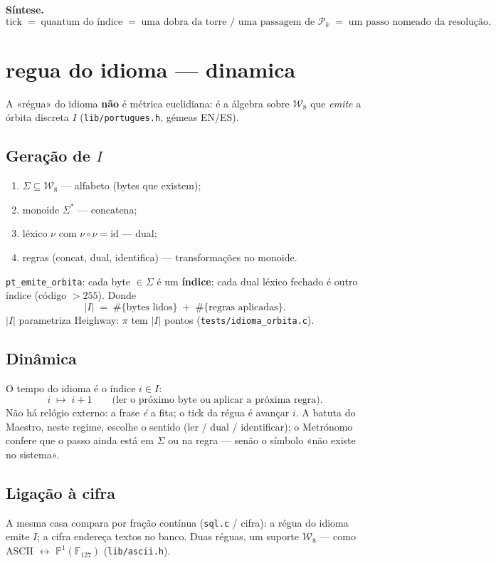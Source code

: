 \documentclass[11pt,a4paper]{article}
\newcommand{\code}[1]{\texttt{\small #1}}
\newcommand{\Word}{\mathcal{W}}
\begin{document}
\medskip\noindent\textbf{Síntese.}
\[
\boxed{
\mathrm{tick}
\;=\;
\text{quantum do índice}
\;=\;
\text{uma dobra da torre / uma passagem de }\mathcal{P}_k
\;=\;
\text{um passo nomeado da resolução}.
}
\]

\section{regua do idioma --- dinamica}\label{sec:regua-idioma}
A «régua» do idioma \textbf{não} é métrica euclidiana: é a álgebra sobre
$\Word_8$ que \emph{emite} a órbita discreta $I$
(\code{lib/portugues.h}, gémeas EN/ES).

\subsection*{Geração de $I$}
\begin{enumerate}\itemsep2pt
\item $\Sigma\subseteq\Word_8$ --- alfabeto (bytes que existem);
\item monoide $\Sigma^{*}$ --- concatena;
\item léxico $\nu$ com $\nu\circ\nu=\mathrm{id}$ --- dual;
\item regras (concat, dual, identifica) --- transformações no monoide.
\end{enumerate}
\code{pt\_emite\_orbita}: cada byte $\in\Sigma$ é um \textbf{índice};
cada dual léxico fechado é outro índice (código $>255$). Donde
\[
|I| \;=\; \#\{\text{bytes lidos}\} \;+\; \#\{\text{regras aplicadas}\}.
\]
$|I|$ parametriza Heighway: $\pi$ tem $|I|$ pontos
(\code{tests/idioma\_orbita.c}).

\subsection*{Dinâmica}
O tempo do idioma é o índice $i\in I$:
\[
i \;\longmapsto\; i+1
\qquad\text{(ler o próximo byte ou aplicar a próxima regra)}.
\]
Não há relógio externo: a frase \emph{é} a fita; o tick da régua é
avançar $i$. A batuta do Maestro, neste regime, escolhe o sentido
(ler / dual / identificar); o Metrónomo confere que o passo ainda está
em $\Sigma$ ou na regra --- senão o símbolo «não existe no sistema».

\subsection*{Ligação à cifra}
A mesma casa compara por fração contínua (\code{sql.c} / cifra): a
régua do idioma emite $I$; a cifra endereça textos no banco. Duas
réguas, um suporte $\Word_8$ --- como ASCII $\leftrightarrow$
$\mathbb{P}^{1}(\mathbb{F}_{127})$ (\code{lib/ascii.h}).
\end{document}
